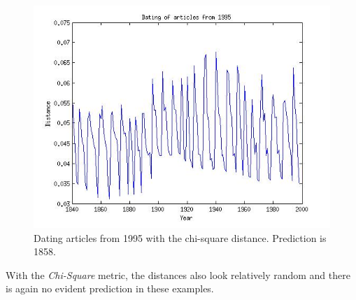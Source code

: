 \begin{figure}[H]
\begin{minipage}[b]{0.3\linewidth}
    \end{minipage}\hfill
    \begin{minipage}[b]{0.3\linewidth}
	\includegraphics[scale=0.25]{Pictures/date_articles/chi2/dating1995_corrected.jpg}
        \caption{Dating articles from 1995 with the chi-square distance. Prediction is 1858.}
        \label{date_chi2}
    \end{minipage}
\end{figure}
With the \emph{Chi-Square} metric, the distances also look relatively random and there is again no evident prediction in these examples.